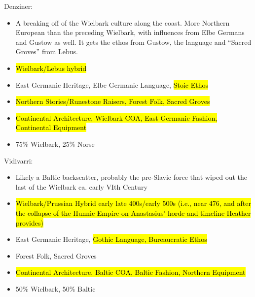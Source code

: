 \documentclass{article}
\begin{document}
	Denziner:
	\begin{itemize}
		\item A breaking off of the Wielbark culture along the coast.
		More Northern European than the preceding Wielbark, with influences from Elbe Germans and Gustow as well.
		It gets the ethos from Gustow, the language and “Sacred Groves” from Lebus.
		\item \hl{Wielbark/Lebus hybrid}
		\item East Germanic Heritage, Elbe Germanic Language, \hl{Stoic Ethos}
		\item \hl{Northern Stories/Runestone Raisers, Forest Folk, Sacred Groves}
		\item \hl{Continental Architecture, Wielbark COA, East Germanic Fashion, Continental Equipment}
		\item 75\% Wielbark, 25\% Norse
	\end{itemize}
	
	Vidivarri:
	\begin{itemize}
		\item Likely a Baltic backscatter, probably the pre-Slavic force that wiped out the last of the Wielbark ca. early VIth Century \cite{Vidivarii}
		\item \hl{Wielbark/Prussian Hybrid early late 400s/early 500s (i.e., near 476, and after the collapse of the Hunnic Empire on Anastasius’ horde and timeline Heather provides)} \cite{Vidivarii,HeatherEmpiresAndBarbarians}
		\item East Germanic Heritage, \hl{Gothic Language, Bureaucratic Ethos}
		\item Forest Folk, Sacred Groves
		\item \hl{Continental Architecture, Baltic COA, Baltic Fashion, Northern Equipment}
		\item 50\% Wielbark, 50\% Baltic
	\end{itemize}
	
\end{document}
